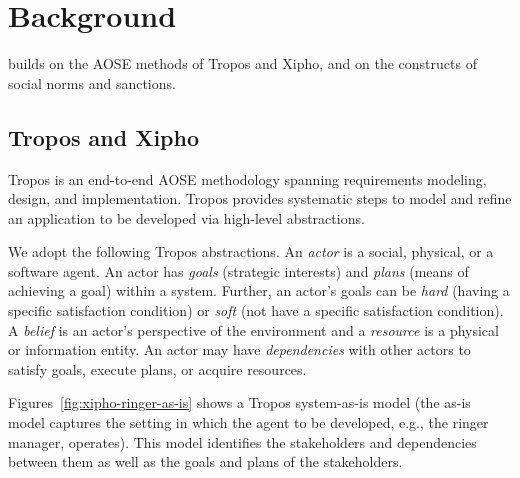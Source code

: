 \section{Background}
\label{sec:arnor-preliminaries}

\frameworkA builds on the AOSE methods of Tropos and Xipho, and on the 
constructs of social norms and sanctions.

\subsection{Tropos and Xipho}
\label{subsec:background}

Tropos \citep{Bresciani-JAAMAS04-Tropos} is an end-to-end AOSE
methodology spanning requirements modeling, design, and implementation.
Tropos provides systematic steps to model and refine an application to
be developed via high-level abstractions.

We adopt the following Tropos abstractions. An \emph{actor} is a social,
physical, or a software agent. An actor has \emph{goals} (strategic
interests) and \emph{plans} (means of achieving a goal) within a
system. Further, an actor's goals can be \emph{hard} (having a specific
satisfaction condition) or \emph{soft} (not have a specific satisfaction 
condition). A \emph{belief} is an actor's perspective of the environment and a
\emph{resource} is a physical or information entity. An actor may have
\emph{dependencies} with other actors to satisfy goals, execute plans,
or acquire resources.

Figures~\ref{fig:xipho-ringer-as-is} shows a Tropos system-as-is model
(the as-is model captures the setting in which the agent to be
developed, e.g., the ringer manager, operates). This model identifies the
stakeholders and dependencies between them as well as the goals and
plans of the stakeholders.

